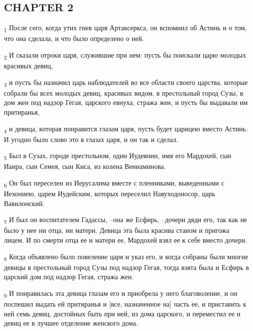 \subsection{CHAPTER 2}
\begin{tcolorbox}
\textsubscript{1} После сего, когда утих гнев царя Артаксеркса, он вспомнил об Астинь и о том, что она сделала, и что было определено о ней.
\end{tcolorbox}
\begin{tcolorbox}
\textsubscript{2} И сказали отроки царя, служившие при нем: пусть бы поискали царю молодых красивых девиц,
\end{tcolorbox}
\begin{tcolorbox}
\textsubscript{3} и пусть бы назначил царь наблюдателей во все области своего царства, которые собрали бы всех молодых девиц, красивых видом, в престольный город Сузы, в дом жен под надзор Гегая, царского евнуха, стража жен, и пусть бы выдавали им притиранья,
\end{tcolorbox}
\begin{tcolorbox}
\textsubscript{4} и девица, которая понравится глазам царя, пусть будет царицею вместо Астинь. И угодно было слово это в глазах царя, и он так и сделал.
\end{tcolorbox}
\begin{tcolorbox}
\textsubscript{5} Был в Сузах, городе престольном, один Иудеянин, имя его Мардохей, сын Иаира, сын Семея, сын Киса, из колена Вениаминова.
\end{tcolorbox}
\begin{tcolorbox}
\textsubscript{6} Он был переселен из Иерусалима вместе с пленниками, выведенными с Иехониею, царем Иудейским, которых переселил Навуходоносор, царь Вавилонский.
\end{tcolorbox}
\begin{tcolorbox}
\textsubscript{7} И был он воспитателем Гадассы, --она же Есфирь, --дочери дяди его, так как не было у нее ни отца, ни матери. Девица эта была красива станом и пригожа лицем. И по смерти отца ее и матери ее, Мардохей взял ее к себе вместо дочери.
\end{tcolorbox}
\begin{tcolorbox}
\textsubscript{8} Когда объявлено было повеление царя и указ его, и когда собраны были многие девицы в престольный город Сузы под надзор Гегая, тогда взята была и Есфирь в царский дом под надзор Гегая, стража жен.
\end{tcolorbox}
\begin{tcolorbox}
\textsubscript{9} И понравилась эта девица глазам его и приобрела у него благоволение, и он поспешил выдать ей притиранья и [все, назначенное на] часть ее, и приставить к ней семь девиц, достойных быть при ней, из дома царского, и переместил ее и девиц ее в лучшее отделение женского дома.
\end{tcolorbox}
